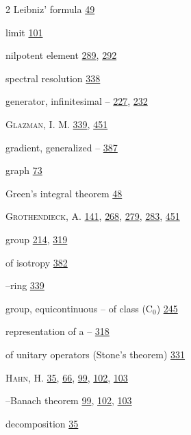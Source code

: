 \begin{multicols}{2}
\hspace*{1.1em}Leibniz' formula \hyperlink{page.49}{49}\par
\hspace*{1.1em}limit \hyperlink{page.101}{101}\par
\hspace*{1.1em}nilpotent element \hyperlink{page.289}{289}, \hyperlink{page.292}{292}\par
\hspace*{1.1em}spectral resolution \hyperlink{page.338}{338}\par
\noindent generator, infinitesimal -- \hyperlink{page.227}{227}, \hyperlink{page.232}{232}\par
\noindent \textsc{Glazman}, I. M. \hyperlink{page.339}{339}, \hyperlink{page.451}{451}\par
\noindent gradient, generalized -- \hyperlink{page.387}{387}\par
\noindent graph \hyperlink{page.73}{73}\par
\noindent Green's integral theorem \hyperlink{page.48}{48}\par
\noindent \textsc{Grothendieck}, A. \hyperlink{page.141}{141}, \hyperlink{page.268}{268}, \hyperlink{page.279}{279}, \hyperlink{page.283}{283}, \hyperlink{page.451}{451}\par
\noindent group \hyperlink{page.214}{214}, \hyperlink{page.319}{319}\par
\hspace*{1.1em}of isotropy \hyperlink{page.382}{382}\par
\hspace*{1.1em}--ring \hyperlink{page.339}{339}\par
\noindent group, equicontinuous -- of class (C$_{0}$) \hyperlink{page.245}{245}\par
\hspace*{1.1em}representation of a -- \hyperlink{page.318}{318}\par
\hspace*{1.1em}of unitary operators (Stone's theorem) \hyperlink{page.331}{331}\par
\noindent \textsc{Hahn}, H. \hyperlink{page.35}{35}, \hyperlink{page.66}{66}, \hyperlink{page.99}{99}, \hyperlink{page.102}{102}, \hyperlink{page.103}{103}\par
\hspace*{1.1em}--Banach theorem \hyperlink{page.99}{99}, \hyperlink{page.102}{102}, \hyperlink{page.103}{103}\par
\hspace*{1.1em}decomposition \hyperlink{page.35}{35}\par

\end{multicols}

